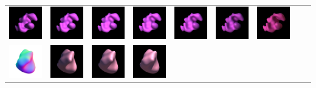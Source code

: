 \begin{center}
\begin{longtable}{@{}c@{}c@{}c@{}c@{}c@{}c@{}c@{}c@{}c@{}}
\includegraphics[width=0.1\linewidth]{training/3_1.png} & \includegraphics[width=0.1\linewidth]{training/3_2.png} &
\includegraphics[width=0.1\linewidth]{training/3_3.png} & \includegraphics[width=0.1\linewidth]{training/3_4.png} &
\includegraphics[width=0.1\linewidth]{training/3_5.png} & \includegraphics[width=0.1\linewidth]{training/3_6.png} &
\includegraphics[width=0.1\linewidth]{training/3_7.png} \\
\includegraphics[width=0.1\linewidth]{training/4_gt.png} & \includegraphics[width=0.1\linewidth]{training/4_0.png} &
\includegraphics[width=0.1\linewidth]{training/4_1.png} & \includegraphics[width=0.1\linewidth]{training/4_2.png} &

\end{longtable}
\end{center}
